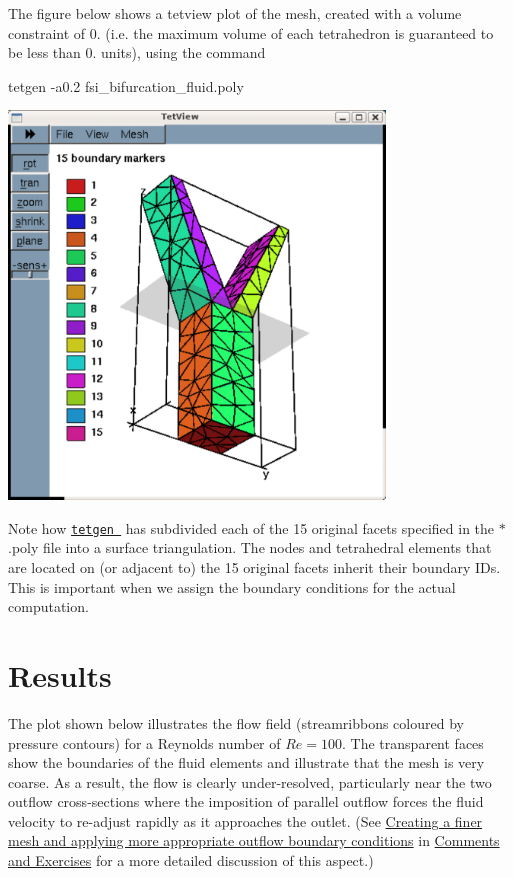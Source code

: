 The figure below shows a {\ttfamily tetview} plot of the mesh, created with a volume constraint of 0. (i.\+e. the maximum volume of each tetrahedron is guaranteed to be less than 0. units), using the command 
\begin{DoxyCode}
tetgen -a0.2 fsi\_bifurcation\_fluid.poly 
\end{DoxyCode}


 
\begin{DoxyImage}
\includegraphics[width=0.75\textwidth]{mesh_boundaries}
\end{DoxyImage}


Note how \href{http://wias-berlin.de/software/tetgen//}{\tt {\ttfamily tetgen} } has subdivided each of the 15 original facets specified in the {\ttfamily $\ast$.poly} file into a surface triangulation. The nodes and tetrahedral elements that are located on (or adjacent to) the 15 original facets inherit their boundary I\+Ds. This is important when we assign the boundary conditions for the actual computation.



 

\hypertarget{index_results}{}\section{Results}\label{index_results}
The plot shown below illustrates the flow field (streamribbons coloured by pressure contours) for a Reynolds number of $ Re = 100. $ The transparent faces show the boundaries of the fluid elements and illustrate that the mesh is very coarse. As a result, the flow is clearly under-\/resolved, particularly near the two outflow cross-\/sections where the imposition of parallel outflow forces the fluid velocity to re-\/adjust rapidly as it approaches the outlet. (See \hyperlink{index_finer_mesh}{Creating a finer mesh and applying more appropriate outflow boundary conditions} in \hyperlink{index_comm_ex}{Comments and Exercises} for a more detailed discussion of this aspect.)

